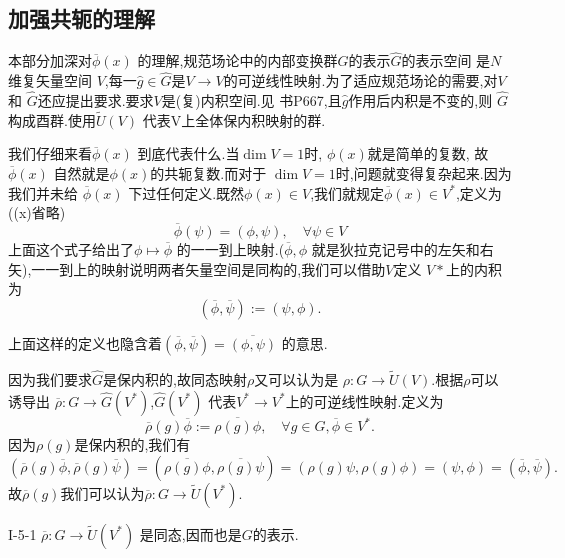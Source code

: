 \documentclass[../main.tex]{subfiles}
\begin{document}
 \subsection{加强共轭的理解}
 \label{sec:I-5-2}
 本部分加深对$\overline{\phi}(x)$ 的理解,规范场论中的内部变换群$G$的表示$\hat{G}$的表示空间 是$N$维复矢量空间 $V$,每一$\hat{g} \in \hat{G}$是$V\to V$的可逆线性映射.为了适应规范场论的需要,对$V$
 和 $\hat{G}$还应提出要求.要求$V$是(复)内积空间.见 书P667,且$\hat{g}$作用后内积是不变的,则 $\hat{G}$构成酉群.使用$\tilde{U}(V)$ 代表V上全体保内积映射的群.

 我们仔细来看$\overline{\phi}(x)$ 到底代表什么.当$\dim V = 1$时, $\phi(x)$就是简单的复数,
 故 $\overline{\phi}(x)$ 自然就是$\phi(x)$的共轭复数.而对于 $\dim V = 1$时,问题就变得复杂起来.因为我们并未给 $\overline{\phi}(x)$ 下过任何定义.既然$\phi(x) \in V$,我们就规定$\overline{\phi}(x) \in V^*$,定义为((x)省略)
 \begin{equation}
 \label{eq:I-5-6}
\overline{\phi}(\psi) = (\phi,\psi), \quad \forall\psi \in V 
 \end{equation}
 上面这个式子给出了$\phi\mapsto \overline{\phi}$ 的一一到上映射.($\overline{\phi},\phi$ 就是狄拉克记号中的左矢和右矢),一一到上的映射说明两者矢量空间是同构的,我们可以借助$V$定义 $V*$上的内积为 \[
 (\overline{\phi},\overline{\psi}) := (\psi,\phi)
 .\] 
 \begin{note}
上面这样的定义也隐含着$(\overline{\phi},\overline{\psi}) = \overline{(\phi,\psi)}$ 的意思. 
 \end{note}
 因为我们要求$\hat{G}$是保内积的,故同态映射$\rho$又可以认为是 $\rho: G \to  \tilde{U}(V)$.根据$\rho$可以诱导出 $\overline{\rho}: G \to \hat{G}(V^*)$,$\hat{G}(V^*)$ 代表$V^* \to V^*$上的可逆线性映射.定义为\[
 \overline{\rho}(g)\overline{\phi} := \overline{\rho(g)\phi}, \quad \forall g\in G, \overline{\phi} \in V^* 
 .\] 因为$\rho(g)$是保内积的,我们有 \[
 (\overline{\rho}(g)\overline{\phi},\overline{\rho}(g)\overline{\psi}) = (\overline{\rho(g)\phi},\overline{\rho(g)\psi}) = (\rho(g)\psi,\rho(g)\phi) = (\psi,\phi) = (\overline{\phi}, \overline{\psi})
 .\]
 故$\overline{\rho}(g)$我们可以认为$\overline{\rho}: G \to \tilde{U}(V^*)$.
 \begin{theorem}
 {}{I-5-1}
 $\overline{\rho}: G\to \tilde{U}(V^*)$ 是同态,因而也是$G$的表示.
 \end{theorem}
\end{document}
